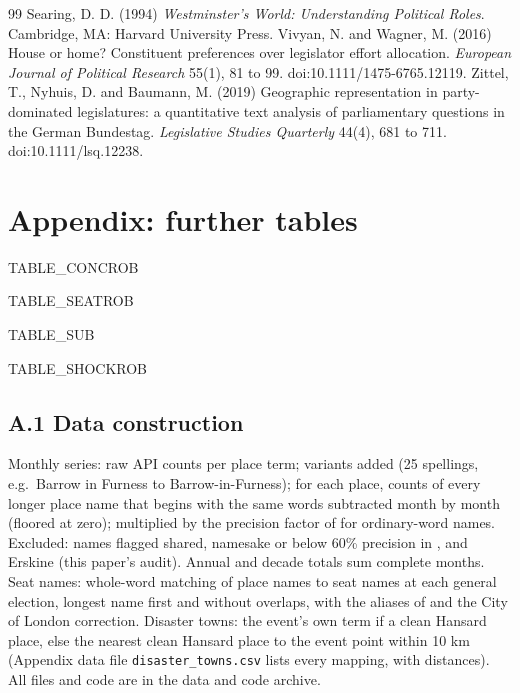 \documentclass[11pt,a4paper]{article}
\begin{document}
\begin{thebibliography}{99}
 Searing, D. D. (1994) \textit{Westminster's World: Understanding Political Roles}. Cambridge, MA: Harvard University Press.
 Vivyan, N. and Wagner, M. (2016) House or home? Constituent preferences over legislator effort allocation. \textit{European Journal of Political Research} 55(1), 81 to 99. doi:10.1111/1475-6765.12119.
 Zittel, T., Nyhuis, D. and Baumann, M. (2019) Geographic representation in party-dominated legislatures: a quantitative text analysis of parliamentary questions in the German Bundestag. \textit{Legislative Studies Quarterly} 44(4), 681 to 711. doi:10.1111/lsq.12238.
\end{thebibliography}

\appendix
\section{Appendix: further tables}
{{TABLE_CONCROB}}

{{TABLE_SEATROB}}

{{TABLE_SUB}}

{{TABLE_SHOCKROB}}

\subsection*{A.1 Data construction}
Monthly series: raw API counts per place term; variants added (25 spellings, e.g.\ Barrow in Furness to Barrow-in-Furness); for each place, counts of every longer place name that begins with the same words subtracted month by month (floored at zero); multiplied by the precision factor of \citet{hotham2026a} for ordinary-word names. Excluded: names flagged shared, namesake or below 60\% precision in \citet{hotham2026a}, and Erskine (this paper's audit). Annual and decade totals sum complete months. Seat names: whole-word matching of place names to seat names at each general election, longest name first and without overlaps, with the aliases of \citet{hotham2026c} and the City of London correction. Disaster towns: the event's own term if a clean Hansard place, else the nearest clean Hansard place to the event point within 10 km (Appendix data file \texttt{disaster\_towns.csv} lists every mapping, with distances). All files and code are in the data and code archive.
\end{document}
